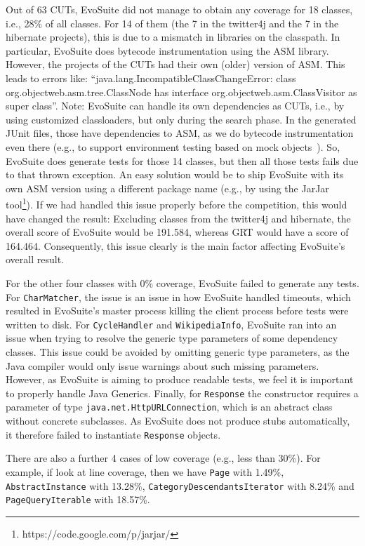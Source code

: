 \documentclass[10pt,conference,compsocconf]{IEEEtran}
\newcommand{\codeid}[1]{\texttt{#1}}
\def\<#1>{\codeid{#1}}
\newcommand{\EVOSUITE}{{\sc EvoSuite}\xspace}
\begin{document}
Out of 63 CUTs, \EVOSUITE did not manage to obtain any coverage for 18
classes, i.e., 28\% of all classes.  For 14 of them (the 7 in the
twitter4j and the 7 in the hibernate projects), this is due to a
mismatch in libraries on the classpath.  In particular, \EVOSUITE does
bytecode instrumentation using the ASM library.  However, the projects
of the CUTs had their own (older) version of ASM.  This leads to
errors like: ``java.lang.IncompatibleClassChangeError: class
org.objectweb.asm.tree.ClassNode has interface
org.objectweb.asm.ClassVisitor as super class''.  Note: \EVOSUITE can
handle its own dependencies as CUTs, i.e., by using customized
classloaders, but only during the search phase.  In the generated
JUnit files, those have dependencies to ASM, as we do bytecode
instrumentation even there (e.g., to support environment testing based
on mock objects~\cite{arcuri2014automated}).  So, \EVOSUITE does
generate tests for those 14 classes, but then all those tests fails
due to that thrown exception.  An easy solution would be to ship
\EVOSUITE with its own ASM version using a different package name
(e.g., by using the JarJar
tool\footnote{https://code.google.com/p/jarjar/}).
%
If we had handled this issue properly before the competition, this
would have changed the result: Excluding classes from the twitter4j
and hibernate, the overall score of \EVOSUITE would be 191.584,
whereas GRT would have a score of 164.464. Consequently, this issue
clearly is the main factor affecting \EVOSUITE's overall result.

For the other four classes with 0\% coverage, \EVOSUITE failed to
generate any tests. For \<CharMatcher>, the issue is an issue in how
\EVOSUITE handled timeouts, which resulted in \EVOSUITE's master
process killing the client process before tests were written to
disk. For \<CycleHandler> and \<WikipediaInfo>, \EVOSUITE ran into an
issue when trying to resolve the generic type parameters of some
dependency classes. This issue could be avoided by omitting generic
type parameters, as the Java compiler would only issue warnings about
such missing parameters. However, as \EVOSUITE is aiming to produce
readable tests, we feel it is important to properly handle Java
Generics. Finally, for \<Response> the constructor requires a
parameter of type \<java.net.HttpURLConnection>, which is an abstract
class without concrete subclasses. As \EVOSUITE does not produce stubs
automatically, it therefore failed to instantiate \<Response> objects.

There are also a further 4 cases of low coverage (e.g., less than
30\%).  For example, if look at line coverage, then we have \<Page>
with 1.49\%, \<AbstractInstance> with 13.28\%,
\<CategoryDescendantsIterator> with 8.24\% and \<PageQueryIterable>
with 18.57\%.  
\end{document}
